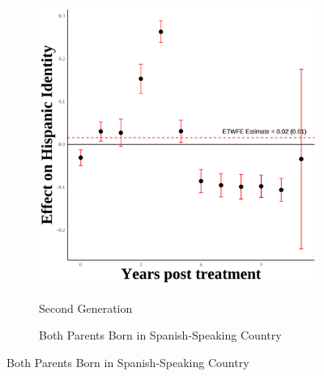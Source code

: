 \documentclass[12pt,english]{article}
\begin{document}
\begin{figure}[H]
\begin{subfigure}[b]{0.30\textwidth}
    \label{fig:hispanic-event-study-fourth}
  \end{subfigure}
  \hfill %
  \begin{subfigure}[b]{0.30\textwidth}
    \centering
    \label{fig:empty} %
  \end{subfigure}

\end{figure}

\pagebreak

\begin{figure}[H]
  \caption{Detailed Analysis of Second Generation Hispanic Identity by Parents' Type}
  \label{fig:second-gen-detailed}
  \centering

  \begin{subfigure}[b]{0.45\textwidth}
    \centering
    \caption{Second Generation}
    \includegraphics[width=\linewidth]{figures/secondgen-hispanic_event_study.png}
    \label{fig:second-gen-all}
  \end{subfigure}
  \hfill %
  \begin{subfigure}[b]{0.45\textwidth}
    \centering
    \caption{Both Parents Born in Spanish-Speaking Country}

\end{subfigure}
\end{figure}
\end{document}
